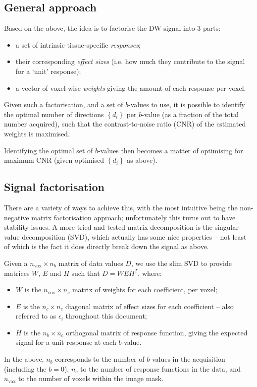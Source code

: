 \documentclass{article}
\newcommand{\nvox}{n_{\textrm{vox}}}
\begin{document}
\subsection{General approach}

Based on the above, the idea is to factorise the DW signal into 3 parts: 
\begin{itemize}
\item a set of intrinsic tissue-specific {\em responses};
\item their corresponding {\em effect sizes} (i.e. how much they contribute to the signal for a `unit' response);
\item a vector of voxel-wise {\em weights} giving the amount of each response per voxel.
\end{itemize}

Given such a factorisation, and a set of $b$-values to use, it is possible to
identify the optimal number of directions $\left\{ d_i \right\}$ per $b$-value (as a fraction of the
total number acquired), such that the contrast-to-noise ratio (CNR) of the
estimated weights is maximised. 

Identifying the optimal set of $b$-values then becomes a matter of optimising
for maximum CNR (given optimised $\left\{ d_i \right\}$ as above).

\subsection{Signal factorisation}

There are a variety of ways to achieve this, with the most intuitive being the
non-negative matrix factorisation approach; unfortunately this turns out to
have stability issues. A more tried-and-tested matrix decomposition is the
singular value decomposition (SVD), which actually has some nice properties --
not least of which is the fact it does directly break down the signal as above. 

Given a $\nvox \times n_b$ matrix of data values $D$, we use the
slim SVD to provide matrices $W$, $E$ and $H$ such that $D = W E H^T$, where:
\begin{itemize}
\item $W$ is the $\nvox \times n_c$ matrix of weights for each coefficient, per voxel;
\item $E$ is the $n_c \times n_c$ diagonal matrix of effect sizes for each
coefficient -- also referred to as $\epsilon_i$ throughout this document;
\item $H$ is the $n_b \times n_c$ orthogonal matrix of response function,
giving the expected signal for a unit response at each $b$-value.
\end{itemize}
In the above, $n_b$ corresponds to the number of $b$-values in the acquisition
(including the $b=0$), $n_c$ to the number of response functions in the data,
and $\nvox$ to the number of voxels within the image mask. 
\end{document}
